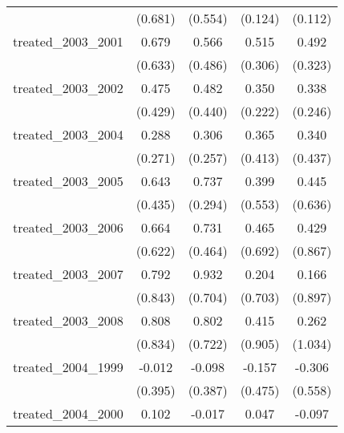 {\begin{tabular}{l*{4}{c}}
            &     (0.681)         &     (0.554)         &     (0.124)         &     (0.112)         \\
[1em]
treated\_2003\_2001&       0.679         &       0.566         &       0.515         &       0.492         \\
            &     (0.633)         &     (0.486)         &     (0.306)         &     (0.323)         \\
[1em]
treated\_2003\_2002&       0.475         &       0.482         &       0.350         &       0.338         \\
            &     (0.429)         &     (0.440)         &     (0.222)         &     (0.246)         \\
[1em]
treated\_2003\_2004&       0.288         &       0.306         &       0.365         &       0.340         \\
            &     (0.271)         &     (0.257)         &     (0.413)         &     (0.437)         \\
[1em]
treated\_2003\_2005&       0.643         &       0.737\sym{*}  &       0.399         &       0.445         \\
            &     (0.435)         &     (0.294)         &     (0.553)         &     (0.636)         \\
[1em]
treated\_2003\_2006&       0.664         &       0.731         &       0.465         &       0.429         \\
            &     (0.622)         &     (0.464)         &     (0.692)         &     (0.867)         \\
[1em]
treated\_2003\_2007&       0.792         &       0.932         &       0.204         &       0.166         \\
            &     (0.843)         &     (0.704)         &     (0.703)         &     (0.897)         \\
[1em]
treated\_2003\_2008&       0.808         &       0.802         &       0.415         &       0.262         \\
            &     (0.834)         &     (0.722)         &     (0.905)         &     (1.034)         \\
[1em]
treated\_2004\_1999&      -0.012         &      -0.098         &      -0.157         &      -0.306         \\
            &     (0.395)         &     (0.387)         &     (0.475)         &     (0.558)         \\
[1em]
treated\_2004\_2000&       0.102         &      -0.017         &       0.047         &      -0.097         \\

\end{tabular}}
